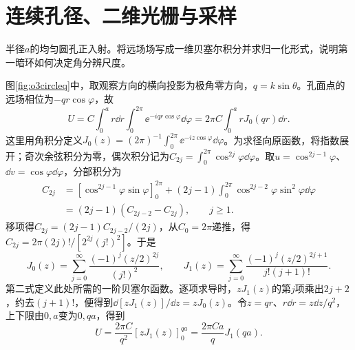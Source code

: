 \section{连续孔径、二维光栅与采样}
\begin{example}\label{ex:o3circular}
半径$a$的均匀圆孔正入射。将远场场写成一维贝塞尔积分并求归一化形式，说明第一暗环如何决定角分辨尺度。
\end{example}
\begin{solution}
图\ref{fig:o3circleq}中，取观察方向的横向投影为极角零方向，$q=k\sin\theta$。孔面点的远场相位为$-qr\cos\varphi$，故
\[
 U=C\int_0^a r\dd r\int_0^{2\pi}\ee^{-iqr\cos\varphi}\dd\varphi
 =2\pi C\int_0^a rJ_0(qr)\dd r.
\]
这里用角积分定义$J_0(z)=(2\pi)^{-1}\int_0^{2\pi}\ee^{-iz\cos\varphi}\dd\varphi$。为求径向原函数，将指数展开；奇次余弦积分为零，偶次积分记为$C_{2j}=\int_0^{2\pi}\cos^{2j}\varphi\dd\varphi$。取$u=\cos^{2j-1}\varphi$、$\dd v=\cos\varphi\dd\varphi$，分部积分为
\begin{align*}
 C_{2j}&=[\cos^{2j-1}\varphi\sin\varphi]_0^{2\pi}
 +(2j-1)\int_0^{2\pi}\cos^{2j-2}\varphi\sin^2\varphi\dd\varphi\\
 &=(2j-1)(C_{2j-2}-C_{2j}),\qquad j\geq1.
\end{align*}
移项得$C_{2j}=(2j-1)C_{2j-2}/(2j)$，从$C_0=2\pi$递推，得$C_{2j}=2\pi(2j)!/[2^{2j}(j!)^2]$。于是
\[
 J_0(z)=\sum_{j=0}^{\infty}\frac{(-1)^j(z/2)^{2j}}{(j!)^2},
 \qquad
 J_1(z)=\sum_{j=0}^{\infty}
 \frac{(-1)^j(z/2)^{2j+1}}{j!(j+1)!}.
\]
第二式定义此处所需的一阶贝塞尔函数。逐项求导时，$zJ_1(z)$的第$j$项乘出$2j+2$，约去$(j+1)!$，便得到$\dd[zJ_1(z)]/\dd z=zJ_0(z)$。令$z=qr$、$r\dd r=z\dd z/q^2$，上下限由$0,a$变为$0,qa$，得到
\[
 U=\frac{2\pi C}{q^2}[zJ_1(z)]_0^{qa}
 =\frac{2\pi Ca}{q}J_1(qa).
\]
\end{solution}
